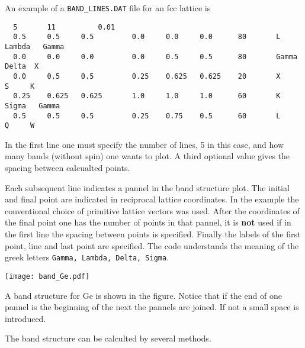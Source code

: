 \documentclass[11pt]{article}
\begin{document}
An example of a \texttt{BAND\_LINES.DAT} file for an fcc lattice is
\begin{verbatim}
  5       11          0.01
  0.5     0.5     0.5         0.0     0.0     0.0      80       L   Lambda   Gamma
  0.0     0.0     0.0         0.0     0.5     0.5      80       Gamma  Delta  X
  0.0     0.5     0.5         0.25    0.625   0.625    20       X       S     K
  0.25    0.625   0.625       1.0     1.0     1.0      60       K    Sigma   Gamma
  0.5     0.5     0.5         0.25    0.75    0.5      60       L      Q     W
\end{verbatim}
In the first line one must specify the number of lines, 5 in this case, and
how many bands (without spin) one wants to plot.  A third optional value
gives the spacing between calcualted points.

Each subsequent line indicates a pannel in the band structure plot.
The initial and final point are indicated in reciprocal lattice
coordinates.  In the example the conventional choice of
primitive lattice vectors was used.  After the coordinates of the final point
one has the number of points in that pannel, it is {\bf not} used if in the first
line the spacing between points is specified.  Finally the
labels of the first point, line and last point are specified.
The code understands the meaning of the greek letters \texttt{Gamma, Lambda, Delta, Sigma}.

\texttt{[image: band\_Ge.pdf]}

A band structure for Ge is shown in the figure.  Notice that if the end of one pannel
is the beginning of the next the pannels are joined.  If not a small space is introduced.

The band structure can be calculted by several methods.
\end{document}
